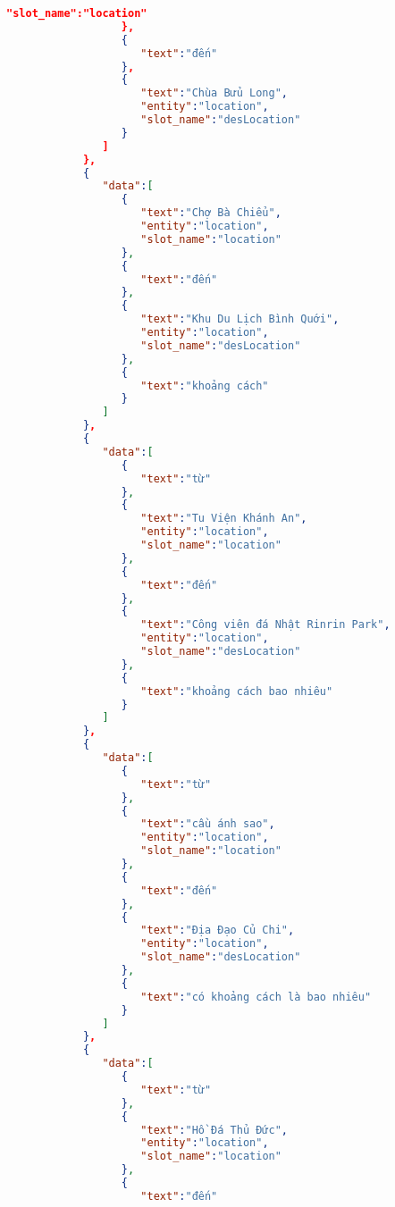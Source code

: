\begin{lstlisting}[language=json,firstnumber=1]
                     "slot_name":"location"
                  },
                  {
                     "text":"đến"
                  },
                  {
                     "text":"Chùa Bửu Long",
                     "entity":"location",
                     "slot_name":"desLocation"
                  }
               ]
            },
            {
               "data":[
                  {
                     "text":"Chợ Bà Chiểu",
                     "entity":"location",
                     "slot_name":"location"
                  },
                  {
                     "text":"đến"
                  },
                  {
                     "text":"Khu Du Lịch Bình Quới",
                     "entity":"location",
                     "slot_name":"desLocation"
                  },
                  {
                     "text":"khoảng cách"
                  }
               ]
            },
            {
               "data":[
                  {
                     "text":"từ"
                  },
                  {
                     "text":"Tu Viện Khánh An",
                     "entity":"location",
                     "slot_name":"location"
                  },
                  {
                     "text":"đến"
                  },
                  {
                     "text":"Công viên đá Nhật Rinrin Park",
                     "entity":"location",
                     "slot_name":"desLocation"
                  },
                  {
                     "text":"khoảng cách bao nhiêu"
                  }
               ]
            },
            {
               "data":[
                  {
                     "text":"từ"
                  },
                  {
                     "text":"cầu ánh sao",
                     "entity":"location",
                     "slot_name":"location"
                  },
                  {
                     "text":"đến"
                  },
                  {
                     "text":"Địa Đạo Củ Chi",
                     "entity":"location",
                     "slot_name":"desLocation"
                  },
                  {
                     "text":"có khoảng cách là bao nhiêu"
                  }
               ]
            },
            {
               "data":[
                  {
                     "text":"từ"
                  },
                  {
                     "text":"Hồ Đá Thủ Đức",
                     "entity":"location",
                     "slot_name":"location"
                  },
                  {
                     "text":"đến"

\end{lstlisting}
